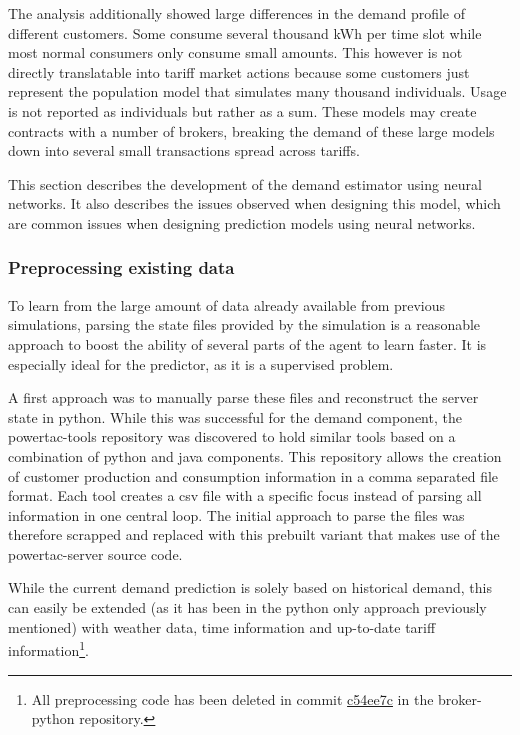 The analysis additionally showed large differences in the demand profile of different customers. Some consume several thousand
\ac{kWh} per time slot while most normal consumers only consume small amounts. This however is not directly
translatable into tariff market actions because some customers just represent the population model that simulates many
thousand individuals. Usage is not reported as individuals but rather as a sum. These models may create contracts with a
number of brokers, breaking the demand of these large models down into several small transactions spread across tariffs.

This section describes the development of the demand estimator using neural networks. It also describes the issues
observed when designing this model, which are common issues when designing prediction models using neural networks.

\subsubsection{Preprocessing existing data}
\label{sub:preprocessing}


To learn from the large amount of data already available from previous simulations, parsing the state files provided by
the simulation is a reasonable approach to boost the ability of several parts of the agent to learn faster. It is
especially ideal for the predictor, as it is a supervised problem.

A first approach was to manually parse these files and reconstruct the server state in python.
While this was successful for the demand component, the powertac-tools repository was discovered to hold similar tools
based on a combination of python and java components. This repository allows the creation of customer production and
consumption information in a comma separated file format. Each tool creates a csv file with a specific focus instead of
parsing all information in one central loop. The initial approach to parse the files was therefore scrapped
and replaced with this prebuilt variant that makes use of the powertac-server source code. 

While the current demand prediction is solely based on historical demand, this can easily be extended (as it has been in
the python only approach previously mentioned) with weather data, time information and up-to-date tariff
information\footnote{All preprocessing code has been deleted in commit
    \href{https://github.com/pascalwhoop/broker-python/commit/c54ee7c05585d15462f40e2be6850343e8aea27a}{c54ee7c} in the
broker-python repository.}.



